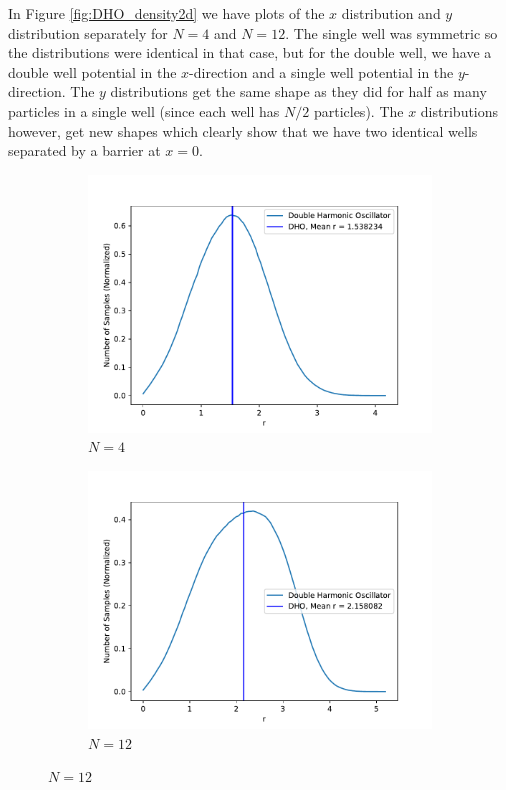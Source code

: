 \documentclass[../main.tex]{subfiles}
\begin{document}
In Figure \ref{fig:DHO_density2d} we have plots of the $x$ distribution and $y$ distribution separately for $N=4$ and $N=12$. The single well was symmetric so the distributions were identical in that case, but for the double well, we have a double well potential in the $x$-direction and a single well potential in the $y$-direction. The $y$ distributions get the same shape as they did for half as many particles in a single well (since each well has $N/2$ particles). The $x$ distributions however, get new shapes which clearly show that we have two identical wells separated by a barrier at $x=0$.

\begin{figure}[!ht]
\centering
\begin{subfigure}{0.48\textwidth}
\includegraphics[width=\linewidth]{figures/densityDHO/density_DHO_N4_Omega1_2d}
\caption{$N=4$} \label{fig:DHO_N4_2d_a}
\end{subfigure}\hspace*{\fill}
\begin{subfigure}{0.48\textwidth}
\includegraphics[width=\linewidth]{figures/densityDHO/density_DHO_N12_Omega1_2d}
\caption{$N=12$} \label{fig:DHO_N12_2d_b}
\end{subfigure}


\end{figure}
\end{document}
